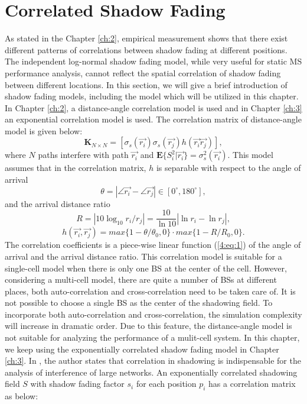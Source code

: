  \section{Correlated Shadow Fading}
 \label{4:CorrShadowField}
 As stated in the Chapter \ref{ch:2}, empirical measurement shows that there exist different patterns of correlations between shadow fading at different positions. The independent log-normal shadow fading model, while very useful for static MS performance analysis, cannot reflect the spatial correlation of shadow fading between different locations. In this section, we will give a brief introduction of shadow fading models, including the model which will be utilized in this chapter.
 In Chapter \ref{ch:2}, a distance-angle correlation model is used and in Chapter \ref{ch:3} an exponential correlation model is used. The correlation matrix of distance-angle model is given below:
 \begin{equation}
 \mathbf{K}_{N\times N} = [ \sigma_{s}(\vec{r_{i}})\sigma_{s}(\vec{r_{j}})h(\vec{r_{i}}\vec{r_{j}})],
 \label{4:correlationmatrix}
 \end{equation}
 where $N$ paths interfere with path $\vec{r_{i}}$ and $\mathbf{E}\{S_{i}^{2}|\vec{r_{i}}\}=\sigma_{s}^{2}(\vec{r_{i}})$. This model assumes that in the correlation matrix, $h$ is separable with respect to the angle of arrival
 \begin{equation}
 \theta = |\angle\vec{r_{i}}-\angle\vec{r_{j}}|\in [0^{\circ},180^{\circ}],
 \end{equation}
 and the arrival distance ratio
 \begin{equation}
 R=|10\log_{10}r_{i}/r_{j}|=\frac{10}{\ln 10}|\ln r_{i}-\ln r_{j}|,
 \end{equation}
 \begin{equation}
 h(\vec{r_{i}},\vec{r_{j}})=max\{1-\theta/\theta_{0},0\}\cdot max\{1-R/R_{0},0\}.
 \label{4:eq:1}
 \end{equation}
 The correlation coefficients is a piece-wise linear function (\ref{4:eq:1}) of the angle of arrival and the arrival distance ratio. This correlation model is suitable for a single-cell model when there is only one BS at the center of the cell. However, considering a multi-cell model, there are quite a number of BSs at different places, both auto-correlation and cross-correlation need to be taken care of. It is not possible to choose a single BS as the center of the shadowing field. To incorporate both auto-correlation and cross-correlation, the simulation complexity will increase in dramatic order. Due to this feature, the distance-angle model is not suitable for analyzing the performance of a mulit-cell system. In this chapter, we keep using the exponentially correlated shadow fading model \cite{szyszkowicz2011interference} in Chapter \ref{ch:3}. In \cite{szyszkowicz2011interference}, the author states that correlation in shadowing is indispensable for the analysis of interference of large networks. An exponentially correlated shadowing field $S$ with shadow fading factor $s_{i}$ for each position $p_{i}$ has a correlation matrix as below:
